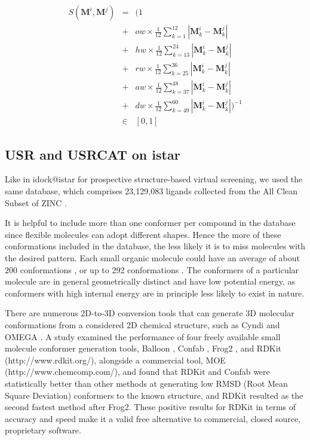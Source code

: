 \begin{eqnarray}
S(\mathbf M^i, \mathbf M^j)&=&(1\nonumber\\
&+&ow\times\frac{1}{12}\sum_{k= 1}^{12}|\mathbf M_k^i-\mathbf M_k^j|\nonumber\\
&+&hw\times\frac{1}{12}\sum_{k=13}^{24}|\mathbf M_k^i-\mathbf M_k^j|\nonumber\\
&+&rw\times\frac{1}{12}\sum_{k=25}^{36}|\mathbf M_k^i-\mathbf M_k^j|\nonumber\\
&+&aw\times\frac{1}{12}\sum_{k=37}^{48}|\mathbf M_k^i-\mathbf M_k^j|\nonumber\\
&+&dw\times\frac{1}{12}\sum_{k=49}^{60}|\mathbf M_k^i-\mathbf M_k^j|)^{-1}\nonumber\\
&\in&[0, 1]
\label{usr:usrcatscore}
\end{eqnarray}

\subsection{USR and USRCAT on istar}

Like in idock@istar for prospective structure-based virtual screening, we used the same database, which comprises 23,129,083 ligands collected from the All Clean Subset of ZINC \citep{532,1178}.

It is helpful to include more than one conformer per compound in the database since flexible molecules can adopt different shapes. Hence the more of these conformations included in the database, the less likely it is to miss molecules with the desired pattern. Each small organic molecule could have an average of about 200 conformations \citep{1332}, or up to 292 conformations \citep{1280}. The conformers of a particular molecule are in general geometrically distinct and have low potential energy, as conformers with high internal energy are in principle less likely to exist in nature.

There are numerous 2D-to-3D conversion tools that can generate 3D molecular conformations from a considered 2D chemical structure, such as Cyndi \citep{1393,1394} and OMEGA \citep{462}. A study \citep{1127} examined the performance of four freely available small molecule conformer generation tools, Balloon \citep{1442}, Confab \citep{1443}, Frog2 \citep{1444}, and RDKit (http://www.rdkit.org/), alongside a commercial tool, MOE (http://www.chemcomp.com/), and found that RDKit and Confab were statistically better than other methods at generating low RMSD (Root Mean Square Deviation) conformers to the known structure, and RDKit resulted as the second fastest method after Frog2. These positive results for RDKit in terms of accuracy and speed make it a valid free alternative to commercial, closed source, proprietary software.

